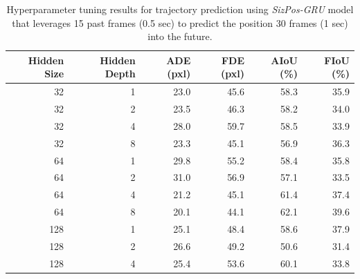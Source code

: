 \documentclass[12pt,oneside]{book} %
\begin{document}
\begin{table}[H]
    \centering
    \caption{Hyperparameter tuning results for trajectory prediction using \textit{SizPos-GRU} model that leverages 15 past frames (0.5 sec) to predict the position 30 frames (1 sec) into the future.}
    \begin{adjustbox}{width=0.8\textwidth}
        \begin{tabular}{rrrrrr}
            \toprule
            \textbf{Hidden Size} & \textbf{Hidden Depth} & \textbf{ADE (pxl)} & \textbf{FDE (pxl)} & \textbf{AIoU (\%)} & \textbf{FIoU (\%)} \\ 
            \midrule
            32                   & 1                     & 23.0               & 45.6               & 58.3               & 35.9               \\
            32                   & 2                     & 23.5               & 46.3               & 58.2               & 34.0               \\
            32                   & 4                     & 28.0               & 59.7               & 58.5               & 33.9               \\
            32                   & 8                     & 23.3               & 45.1               & 56.9               & 36.3               \\
            64                   & 1                     & 29.8               & 55.2               & 58.4               & 35.8               \\
            64                   & 2                     & 31.0               & 56.9               & 57.1               & 33.5               \\
            64                   & 4                     & 21.2               & 45.1               & 61.4               & 37.4               \\
            64                   & 8                     & 20.1               & 44.1               & 62.1               & 39.6               \\
            128                  & 1                     & 25.1               & 48.4               & 58.6               & 37.9               \\
            128                  & 2                     & 26.6               & 49.2               & 50.6               & 31.4               \\
            128                  & 4                     & 25.4               & 53.6               & 60.1               & 33.8               \\

\end{tabular}
\end{adjustbox}
\end{table}
\end{document}

